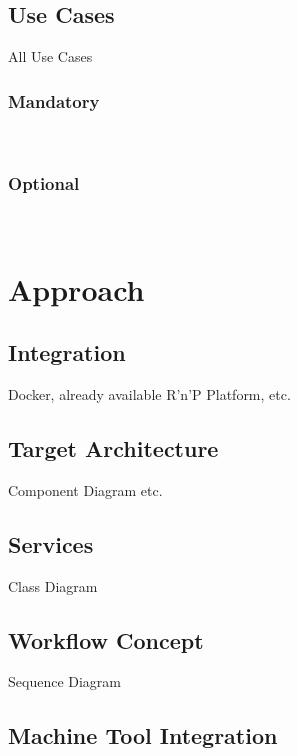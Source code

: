 \documentclass[
a4paper,
twoside,
bibliography=totoc,
headsepline,
cleardoublepage=empty,
parskip=half,
draft=false
]{scrbook}
\begin{document}
			\subsection{Use Cases} \label{subsec:use_cases}
			
				All Use Cases
				
				\subsubsection{Mandatory} \label{subsubsec:mandatory}
				
				\subsubsection{Optional} \label{subsubsec:optional}	
			
		\section{Approach} \label{sec:approach}
		
			\subsection{Integration} \label{subsec:integration}
			
				Docker, already available R'n'P Platform, etc.
				
			\subsection{Target Architecture} \label{subsec:target_architecture}
			
				Component Diagram etc.
			
			\subsection{Services} \label{subsec:services}
			
				Class Diagram
				
			\subsection{Workflow Concept} \label{subsec:workflow_concept}
			
				Sequence Diagram
				
			\subsection{Machine Tool Integration} \label{subsec:machine_tool_intergation}
			
\end{document}
